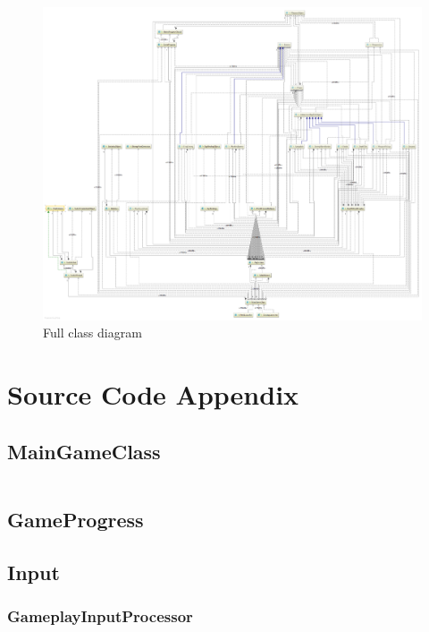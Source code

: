 \documentclass[12p]{article}
\begin{document}
\begin{figure}[ht]
    \centering
    \includegraphics[width=1\textwidth]{Documentation/class_diagram}
    \caption{Full class diagram}
    \label{fig:ClassDiagramFull}
\end{figure}


\section{Source Code Appendix}

\subsection{MainGameClass} \label{MainGameClass.java}
\inputminted[linenos,breaklines]{java}{code/MainGameClass.java}

\subsection{GameProgress}

\subsection{Input}
\subsubsection{GameplayInputProcessor} \label{GameplayInputProcessor.java}
\inputminted[linenos,breaklines]{java}{code/Input/GameplayInputProcessor.java}
\end{document}
